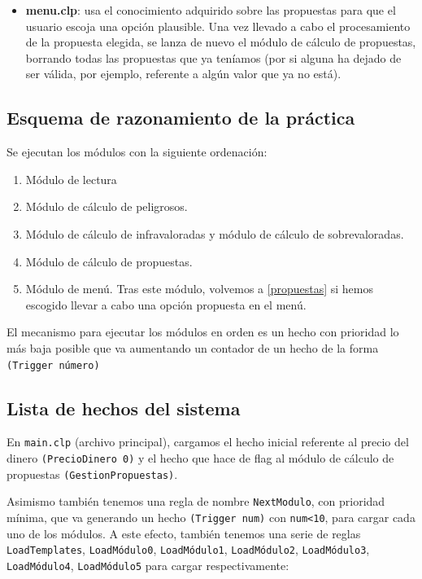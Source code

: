 \documentclass[a4paper,11pt]{article}
\begin{document}
\begin{itemize}
 \item \textbf{menu.clp}: usa el conocimiento adquirido sobre las propuestas para que el usuario escoja una opción plausible.
 Una vez llevado a cabo el procesamiento de la propuesta elegida, se lanza de nuevo el módulo de cálculo de propuestas, borrando
 todas las propuestas que ya teníamos (por si alguna ha dejado de ser válida, por ejemplo, referente a algún valor que ya no está).
\end{itemize}

\subsection{Esquema de razonamiento de la práctica}
Se ejecutan los módulos con la siguiente ordenación:

\begin{enumerate}
 \item Módulo de lectura
 \item Módulo de cálculo de peligrosos.
 \item Módulo de cálculo de infravaloradas y módulo de cálculo de sobrevaloradas.
 \item Módulo de cálculo de propuestas. \label{propuestas}
 \item Módulo de menú. Tras este módulo, volvemos a \ref{propuestas} si hemos escogido llevar a cabo una opción propuesta
 en el menú.
\end{enumerate}


El mecanismo para ejecutar los módulos en orden es un hecho con prioridad lo más baja posible que va aumentando un contador
de un hecho de la forma \texttt{(Trigger número)}

\subsection{Lista de hechos del sistema}

En \texttt{main.clp} (archivo principal), cargamos el hecho inicial referente al precio del dinero \texttt{(PrecioDinero 0)}
y el hecho que hace de flag al módulo de cálculo de propuestas \texttt{(GestionPropuestas)}. 

Asimismo también tenemos una regla de nombre \texttt{NextModulo}, con prioridad mínima, que va generando un hecho \texttt{(Trigger num)}
con \texttt{num<10}, para cargar cada uno de los módulos. A este efecto, también tenemos una serie de reglas \texttt{LoadTemplates},
\texttt{LoadMódulo0}, \texttt{LoadMódulo1}, \texttt{LoadMódulo2}, \texttt{LoadMódulo3}, \texttt{LoadMódulo4}, \texttt{LoadMódulo5} para
cargar respectivamente: 
\end{document}
